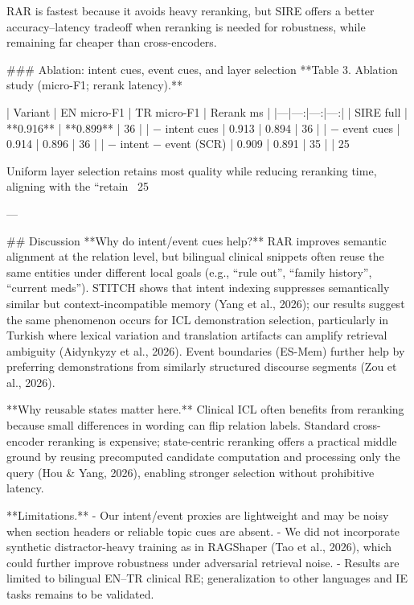 RAR is fastest because it avoids heavy reranking, but SIRE offers a better accuracy–latency tradeoff when reranking is needed for robustness, while remaining far cheaper than cross-encoders.

### Ablation: intent cues, event cues, and layer selection  
**Table 3. Ablation study (micro-F1; rerank latency).**  

| Variant | EN micro-F1 | TR micro-F1 | Rerank ms |
|---|---:|---:|---:|
| SIRE full | **0.916** | **0.899** | 36 |
| − intent cues | 0.913 | 0.894 | 36 |
| − event cues | 0.914 | 0.896 | 36 |
| − intent − event (SCR) | 0.909 | 0.891 | 35 |
| 25%

Uniform layer selection retains most quality while reducing reranking time, aligning with the “retain ~25%

---

## Discussion  
**Why do intent/event cues help?** RAR improves semantic alignment at the relation level, but bilingual clinical snippets often reuse the same entities under different local goals (e.g., “rule out”, “family history”, “current meds”). STITCH shows that intent indexing suppresses semantically similar but context-incompatible memory (Yang et al., 2026); our results suggest the same phenomenon occurs for ICL demonstration selection, particularly in Turkish where lexical variation and translation artifacts can amplify retrieval ambiguity (Aidynkyzy et al., 2026). Event boundaries (ES-Mem) further help by preferring demonstrations from similarly structured discourse segments (Zou et al., 2026).

**Why reusable states matter here.** Clinical ICL often benefits from reranking because small differences in wording can flip relation labels. Standard cross-encoder reranking is expensive; state-centric reranking offers a practical middle ground by reusing precomputed candidate computation and processing only the query (Hou & Yang, 2026), enabling stronger selection without prohibitive latency.

**Limitations.**  
- Our intent/event proxies are lightweight and may be noisy when section headers or reliable topic cues are absent.  
- We did not incorporate synthetic distractor-heavy training as in RAGShaper (Tao et al., 2026), which could further improve robustness under adversarial retrieval noise.  
- Results are limited to bilingual EN–TR clinical RE; generalization to other languages and IE tasks remains to be validated.

